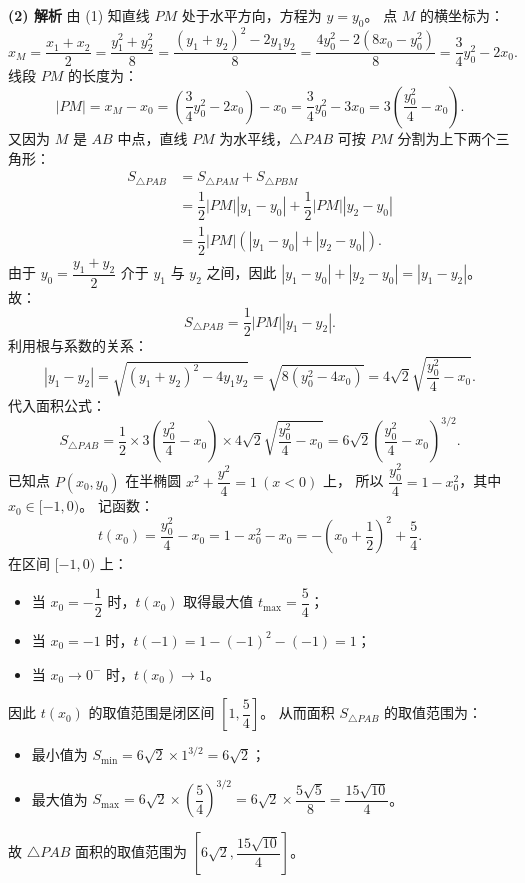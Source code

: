 \begin{answer}
\textbf{(2) 解析} 由 (1) 知直线 $PM$ 处于水平方向，方程为 $y = y_0$。
点 $M$ 的横坐标为：
\nopagebreak[4]
\[x_M = \dfrac{x_1 + x_2}{2} = \dfrac{y_1^2 + y_2^2}{8} = \dfrac{(y_1 + y_2)^2 - 2y_1 y_2}{8} = \dfrac{4y_0^2 - 2(8x_0 - y_0^2)}{8} = \dfrac34 y_0^2 - 2x_0.\]
线段 $PM$ 的长度为：
\nopagebreak[4]
\[|PM| = x_M - x_0 = \left(\dfrac34 y_0^2 - 2x_0\right) - x_0 = \dfrac34 y_0^2 - 3x_0 = 3\left(\dfrac{y_0^2}{4} - x_0\right).\]
又因为 $M$ 是 $AB$ 中点，直线 $PM$ 为水平线，$\triangle PAB$ 可按 $PM$ 分割为上下两个三角形：
\nopagebreak[4]
\[\begin{aligned}
S_{\triangle PAB} &= S_{\triangle PAM} + S_{\triangle PBM} \\
&= \dfrac12 |PM| |y_1 - y_0| + \dfrac12 |PM| |y_2 - y_0| \\
&= \dfrac12 |PM| (|y_1 - y_0| + |y_2 - y_0|).
\end{aligned}\]
由于 $y_0 = \dfrac{y_1 + y_2}{2}$ 介于 $y_1$ 与 $y_2$ 之间，因此 $|y_1 - y_0| + |y_2 - y_0| = |y_1 - y_2|$。
故：
\nopagebreak[4]
\[S_{\triangle PAB} = \dfrac12 |PM| |y_1 - y_2|.\]
利用根与系数的关系：
\nopagebreak[4]
\[|y_1 - y_2| = \sqrt{(y_1 + y_2)^2 - 4y_1 y_2} = \sqrt{8(y_0^2 - 4x_0)} = 4\sqrt2 \sqrt{\dfrac{y_0^2}{4} - x_0}.\]
代入面积公式：
\nopagebreak[4]
\[S_{\triangle PAB} = \dfrac12 \times 3\left(\dfrac{y_0^2}{4} - x_0\right) \times 4\sqrt2 \sqrt{\dfrac{y_0^2}{4} - x_0} = 6\sqrt2 \left(\dfrac{y_0^2}{4} - x_0\right)^{3/2}.\]
已知点 $P(x_0, y_0)$ 在半椭圆 $x^2 + \dfrac{y^2}{4} = 1\ (x < 0)$ 上，
所以 $\dfrac{y_0^2}{4} = 1 - x_0^2$，其中 $x_0 \in [-1, 0)$。
记函数：
\nopagebreak[4]
\[t(x_0) = \dfrac{y_0^2}{4} - x_0 = 1 - x_0^2 - x_0 = -\left(x_0 + \dfrac12\right)^2 + \dfrac54.\]
在区间 $[-1, 0)$ 上：
\begin{itemize}
\item 当 $x_0 = -\dfrac12$ 时，$t(x_0)$ 取得最大值 $t_{\max} = \dfrac54$；
\item 当 $x_0 = -1$ 时，$t(-1) = 1 - (-1)^2 - (-1) = 1$；
\item 当 $x_0 \to 0^-$ 时，$t(x_0) \to 1$。
\end{itemize}
因此 $t(x_0)$ 的取值范围是闭区间 $\left[1, \dfrac54\right]$。
从而面积 $S_{\triangle PAB}$ 的取值范围为：
\begin{itemize}
\item 最小值为 $S_{\min} = 6\sqrt2 \times 1^{3/2} = 6\sqrt2$；
\item 最大值为 $S_{\max} = 6\sqrt2 \times \left(\dfrac54\right)^{3/2} = 6\sqrt2 \times \dfrac{5\sqrt5}{8} = \dfrac{15\sqrt{10}}{4}$。
\end{itemize}
故 $\triangle PAB$ 面积的取值范围为 $\left[6\sqrt2, \dfrac{15\sqrt{10}}{4}\right]$。



\end{answer}
